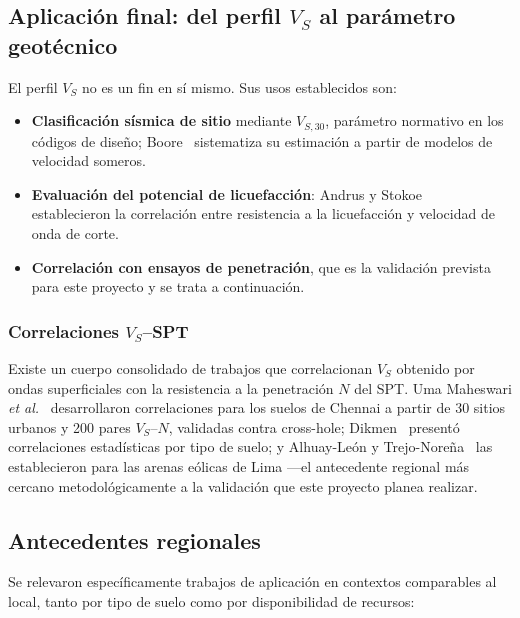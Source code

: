 \subsection{Aplicaci\'on final: del perfil \texorpdfstring{$V_S$}{VS} al par\'ametro geot\'ecnico}

El perfil $V_S$ no es un fin en s\'i mismo. Sus usos establecidos son:

\begin{itemize}[itemsep=0.15em]
    \item \textbf{Clasificaci\'on s\'ismica de sitio} mediante $V_{S,30}$, par\'ametro
    normativo en los c\'odigos de dise\~no; Boore~\cite{Boore2004} sistematiza su estimaci\'on
    a partir de modelos de velocidad someros.
    \item \textbf{Evaluaci\'on del potencial de licuefacci\'on}: Andrus y
    Stokoe~\cite{Andrus2000} establecieron la correlaci\'on entre resistencia a la
    licuefacci\'on y velocidad de onda de corte.
    \item \textbf{Correlaci\'on con ensayos de penetraci\'on}, que es la validaci\'on prevista
    para este proyecto y se trata a continuaci\'on.
\end{itemize}

\subsubsection{Correlaciones \texorpdfstring{$V_S$}{VS}--SPT}

Existe un cuerpo consolidado de trabajos que correlacionan $V_S$ obtenido por ondas
superficiales con la resistencia a la penetraci\'on $N$ del SPT. Uma Maheswari \emph{et
al.}~\cite{UmaMaheswari2010} desarrollaron correlaciones para los suelos de Chennai a
partir de 30 sitios urbanos y 200 pares $V_S$--$N$, validadas contra cross-hole;
Dikmen~\cite{Dikmen2009} present\'o correlaciones estad\'isticas por tipo de suelo; y
Alhuay-Le\'on y Trejo-Nore\~na~\cite{Alhuay2021} las establecieron para las arenas
e\'olicas de Lima ---el antecedente regional m\'as cercano metodol\'ogicamente a la
validaci\'on que este proyecto planea realizar.

\subsection{Antecedentes regionales}

Se relevaron espec\'ificamente trabajos de aplicaci\'on en contextos comparables al local,
tanto por tipo de suelo como por disponibilidad de recursos:

